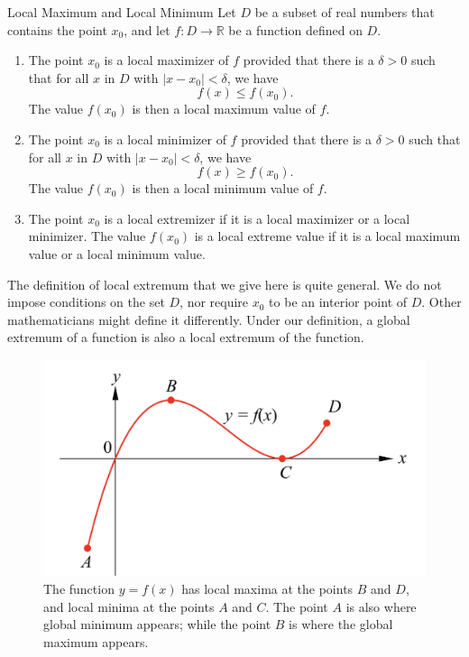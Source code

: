 \begin{definition}{Local Maximum and Local Minimum}
Let $D$ be a subset of real numbers that contains the point $x_0$, and let $f:D\to\mathbb{R}$ be a function defined on $D$. 
\begin{enumerate}[1.]
\item The point  $x_0$ is a local maximizer of $f$
provided that there is a $\delta>0$ such that for all $x$ in $D$ with $|x-x_0|<\delta$,   we have
\[f(x)\leq f(x_0).\]  The value $f(x_0)$ is then  a local maximum value of $f$.
\item  The point  $x_0$ is a local minimizer of $f$
provided that there is a $\delta>0$ such that for all $x$ in $D$ with $|x-x_0|<\delta$,   we have
\[f(x)\geq f(x_0).\]  The value $f(x_0)$ is then  a local minimum value of $f$.
\item The point $x_0$ is a local extremizer if it is a local maximizer or a local minimizer.
 The value $f(x_0)$ is a local extreme value if it is a local maximum value or a local minimum value.
\end{enumerate}
\end{definition}
The definition of local extremum that we give here is quite general. We do not impose conditions on the set $D$, nor require $x_0$ to be an interior point of $D$. Other mathematicians might define it differently. Under our definition, a global extremum of a function is also a local extremum of the function.


 \begin{figure}[ht]
\centering
\includegraphics[scale=0.2]{Picture22.png}
\caption{  The function $y=f(x)$ has local maxima at the points $B$ and $D$, and local minima at the points $A$ and $C$. The point $A$ is also where global minimum appears; while the point $B$ is where the global maximum appears.\fa}\label{figure22}
\end{figure}

